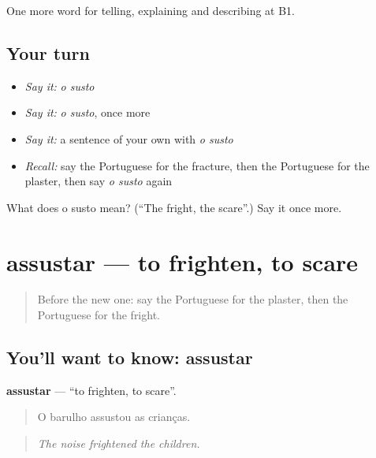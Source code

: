 \begin{grammarlens}[title={What you've built}]
One more word for telling, explaining and describing at B1.
\end{grammarlens}

\subsection*{Your turn}
\begin{itemize}
\raggedright
  \item \emph{Say it:} \emph{o susto}
  \item \emph{Say it:} \emph{o susto}, once more
  \item \emph{Say it:} a sentence of your own with \emph{o susto}
  \item \emph{Recall:} say the Portuguese for the fracture, then the Portuguese for the plaster, then say \emph{o susto} again
\end{itemize}

\begin{tcolorbox}[breakable,colback=teal!4,colframe=teal!35!black,title={Before you move on}]
What does o susto mean? (\textquotedblleft{}The fright, the scare\textquotedblright{}.) Say it once more.
\end{tcolorbox}
\section[assustar]{assustar — to frighten, to scare}

\label{lesson:PT-C308-assustar}



\begin{quote}
Before the new one: say the Portuguese for the plaster, then the Portuguese for the fright.
\end{quote}

\subsection*{You'll want to know: assustar}
\textbf{assustar} — \textquotedblleft{}to frighten, to scare\textquotedblright{}.

\begin{quote}
O barulho assustou as crianças.
\end{quote}

\begin{quote}
\emph{The noise frightened the children.}
\end{quote}

